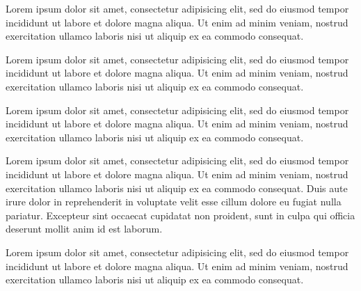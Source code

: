\documentclass{book}
\begin{document}
\beginnumbering
\pstart
Lorem ipsum dolor sit amet, consectetur adipisicing elit, sed do eiusmod tempor incididunt ut labore et dolore magna aliqua. Ut enim ad minim veniam, nostrud exercitation ullamco laboris nisi ut aliquip ex ea commodo consequat. 
\pend
\endnumbering

\begin{pages}
\begin{Leftside}
\beginnumbering
\pstart
\begin{ledgroup}

Lorem ipsum dolor sit amet, consectetur adipisicing elit, sed do eiusmod tempor incididunt ut labore et dolore magna aliqua. Ut enim ad minim veniam, nostrud exercitation ullamco laboris nisi ut aliquip ex ea commodo consequat. 
\end{ledgroup}
\pend

\pstart
\begin{ledgroup}

Lorem ipsum dolor sit amet, consectetur adipisicing elit, sed do eiusmod tempor incididunt ut labore et dolore magna aliqua. Ut enim ad minim veniam, nostrud exercitation ullamco laboris nisi ut aliquip ex ea commodo consequat. 
\end{ledgroup}
\pend

\endnumbering
\end{Leftside}

\begin{Rightside}
\beginnumbering

\pstart
\begin{ledgroup}

Lorem ipsum dolor sit amet, consectetur adipisicing elit, sed do eiusmod tempor incididunt ut labore et dolore magna aliqua. Ut enim ad minim veniam, nostrud exercitation ullamco laboris nisi ut aliquip ex ea commodo consequat. Duis aute irure dolor in reprehenderit in voluptate velit esse cillum dolore eu fugiat nulla pariatur. Excepteur sint occaecat cupidatat non proident, sunt in culpa qui officia deserunt mollit anim id est laborum.
\end{ledgroup}
\pend

\pstart
\begin{ledgroup}
\skipnumbering Lorem ipsum dolor sit amet, consectetur adipisicing elit, sed do eiusmod tempor incididunt ut labore et dolore magna aliqua. Ut enim ad minim veniam, nostrud exercitation ullamco laboris nisi ut aliquip ex ea commodo consequat.
\end{ledgroup}
\pend

\endnumbering
\end{Rightside}
\Pages
\end{pages}
\end{document}
